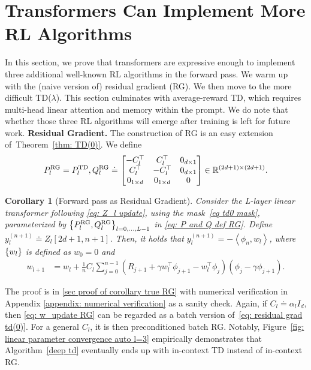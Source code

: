 \documentclass{article}
\newcommand{\R}{\mathbb{R}}
\newcommand{\indot}[2]{{\left<#1, #2\right>}}
\newcommand{\td}{\text{TD}}
\newcommand{\rg}{\text{RG}}
\newtheorem{corollary}{Corollary}
\begin{document}
\section{Transformers Can Implement More RL Algorithms}
In this section,
we prove that transformers are expressive enough
to implement three additional well-known RL algorithms in the forward pass.
We warm up with the (naive version of) residual gradient (RG).
We then move to the more difficult TD($\lambda$).
This section culminates with average-reward TD,
which requires multi-head linear attention and memory within the prompt.
We do note that whether those three RL algorithms will emerge after training is left for future work.
\textbf{Residual Gradient.}
The construction of RG is an easy extension of~Theorem~\ref{thm: TD(0)}.
We define
\begin{align}
    P_l^{\rg} = P_l^{\td}, Q_l^{\rg}
    \doteq \mqty[-C_l^\top & C_l^\top & 0_{d \times 1} \\
                 C_l^\top  & -C_l^\top & 0_{d \times 1} \\
                 0_{1 \times d} & 0_{1 \times d} & 0] \in \R^{(2d+1) \times (2d+1)}. \label{eq: P and Q def RG}
\end{align}
\begin{corollary}[Forward pass as Residual Gradient]
    \label{corollary: true RG}
    Consider the L-layer linear transformer following \eqref{eq: Z_l update}, using the mask~\eqref{eq td0 mask}, parameterized by $\qty{P_l^{\rg}, Q_l^{\rg}}_{l=0,\dots, L-1}$ in \eqref{eq: P and Q def RG}.
    Define $y_l^{(n+1)} \doteq Z_l[2d+1, n+1]$.
    Then, it holds that $y_l^{(n+1)} =  - \indot{\phi_n}{w_l}$,
    where $\qty{w_l}$ is defined as $w_0 = 0$ and
    \begin{align}
     w_{l+1} &= \textstyle w_l + \frac{1}{n} C_l \sum_{j=0}^{n-1}  \left(R_{j+1} + \gamma w_l^\top\phi_{j+1} - w_l^\top\phi_j\right)(\phi_j - \gamma \phi_{j+1}). \label{eq: w_update RG}
    \end{align}
\end{corollary}
The proof is in \ref{sec proof of corollary true RG} with numerical verification in Appendix \ref{appendix: numerical verification} as a sanity check.
Again,
if $C_l \doteq \alpha_l I_d$,
then \eqref{eq: w_update RG} can be regarded as a batch version of~\eqref{eq: residual grad td(0)}.
For a general $C_l$,
it is then preconditioned batch RG.
Notably, Figure~\ref{fig: linear parameter convergence auto l=3} empirically  demonstrates that Algorithm~\ref{deep td} eventually ends up with in-context TD instead of in-context RG.
\end{document}
